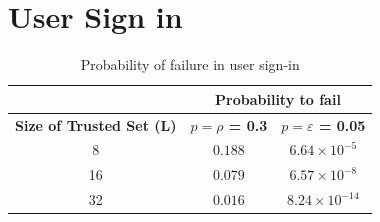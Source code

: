 %
%
%
%
%


\section{User Sign in}
\label{sec:eval_sign_in}
  \begin{table}
    \centering
    \footnotesize
    \begin{tabular}{|c|c|c|}
      \cline{2-3}
      \multicolumn{1}{c|}{}&  \multicolumn{2}{c|}{\textbf{Probability to fail}} \\ \cline{2-3}
      \hline
      \textbf{Size of Trusted Set (L)} & \textbf{$p = \rho$ = 0.3} &  \textbf{$p = \varepsilon$ = 0.05} \\
      \hline \hline
      8 &  $0.188$ & $6.64 \times 10^{-5}$ \\
      \hline
      16 & $0.079$ & $6.57 \times 10^{-8}$  \\
      \hline
      32 & $0.016$ & $8.24 \times 10^{-14}$  \\
      \hline
    \end{tabular}
    \caption{Probability of failure in user sign-in}
    \label{tab:p_sign_in}
  \end{table}
  
